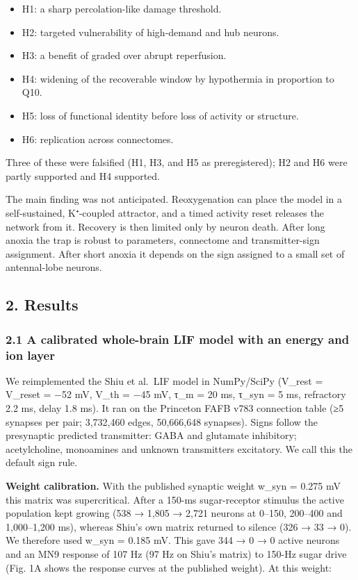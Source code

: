 \documentclass[11pt]{article}
\providecommand{\tightlist}{\setlength{\itemsep}{0pt}\setlength{\parskip}{0pt}}
\begin{document}
\begin{itemize}
\tightlist
\item
  H1: a sharp percolation-like damage threshold.
\item
  H2: targeted vulnerability of high-demand and hub neurons.
\item
  H3: a benefit of graded over abrupt reperfusion.
\item
  H4: widening of the recoverable window by hypothermia in proportion to Q10.
\item
  H5: loss of functional identity before loss of activity or structure.
\item
  H6: replication across connectomes.
\end{itemize}

Three of these were falsified (H1, H3, and H5 as preregistered); H2 and H6 were partly supported and H4 supported.

The main finding was not anticipated. Reoxygenation can place the model in a self-sustained, K⁺-coupled attractor, and a timed activity reset releases the network from it. Recovery is then limited only by neuron death. After long anoxia the trap is robust to parameters, connectome and transmitter-sign assignment. After short anoxia it depends on the sign assigned to a small set of antennal-lobe neurons.

\subsection{2. Results}\label{results}

\subsubsection{2.1 A calibrated whole-brain LIF model with an energy and ion layer}\label{a-calibrated-whole-brain-lif-model-with-an-energy-and-ion-layer}

We reimplemented the Shiu et al.~LIF model \cite{shiu2024} in NumPy/SciPy (V\_rest = V\_reset = −52 mV, V\_th = −45 mV, τ\_m = 20 ms, τ\_syn = 5 ms, refractory 2.2 ms, delay 1.8 ms). It ran on the Princeton FAFB v783 connection table (≥5 synapses per pair; 3,732,460 edges, 50,666,648 synapses). Signs follow the presynaptic predicted transmitter: GABA and glutamate inhibitory; acetylcholine, monoamines and unknown transmitters excitatory. We call this the default sign rule.

\textbf{Weight calibration.} With the published synaptic weight w\_syn = 0.275 mV this matrix was supercritical. After a 150-ms sugar-receptor stimulus the active population kept growing (538 → 1,805 → 2,721 neurons at 0--150, 200--400 and 1,000--1,200 ms), whereas Shiu's own matrix returned to silence (326 → 33 → 0). We therefore used w\_syn = 0.185 mV. This gave 344 → 0 → 0 active neurons and an MN9 response of 107 Hz (97 Hz on Shiu's matrix) to 150-Hz sugar drive (Fig. 1A shows the response curves at the published weight). At this weight:
\end{document}
